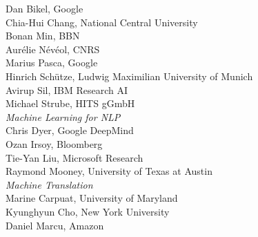                                     \hspace*{0.2in} Dan Bikel, Google \\
                                    \hspace*{0.2in} Chia-Hui Chang, National Central University \\
                                    \hspace*{0.2in} Bonan Min, BBN \\
                                    \hspace*{0.2in} Aur\'{e}lie N\'{e}v\'{e}ol, CNRS \\
                                    \hspace*{0.2in} Marius Pasca, Google \\
                                    \hspace*{0.2in} Hinrich Sch\"{u}tze, Ludwig Maximilian University of Munich \\
                                    \hspace*{0.2in} Avirup Sil, IBM Research AI \\
                                    \hspace*{0.2in} Michael Strube, HITS gGmbH \\
                            \emph{Machine Learning for NLP} \\
                                    \hspace*{0.2in} Chris Dyer, Google DeepMind \\
                                    \hspace*{0.2in} Ozan Irsoy, Bloomberg \\
                                    \hspace*{0.2in} Tie-Yan Liu, Microsoft Research \\
                                    \hspace*{0.2in} Raymond Mooney, University of Texas at Austin  \\
                            \emph{Machine Translation} \\
                                    \hspace*{0.2in} Marine Carpuat, University of Maryland \\
                                    \hspace*{0.2in} Kyunghyun Cho, New York University \\
                                    \hspace*{0.2in} Daniel Marcu, Amazon \\
